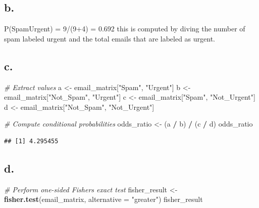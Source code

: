 \documentclass[
]{article}
\newenvironment{Shaded}{\begin{snugshade}}{\end{snugshade}}
\newcommand{\AttributeTok}[1]{\textcolor[rgb]{0.13,0.29,0.53}{#1}}
\newcommand{\CommentTok}[1]{\textcolor[rgb]{0.56,0.35,0.01}{\textit{#1}}}
\newcommand{\FunctionTok}[1]{\textcolor[rgb]{0.13,0.29,0.53}{\textbf{#1}}}
\newcommand{\NormalTok}[1]{#1}
\newcommand{\OtherTok}[1]{\textcolor[rgb]{0.56,0.35,0.01}{#1}}
\newcommand{\SpecialCharTok}[1]{\textcolor[rgb]{0.81,0.36,0.00}{\textbf{#1}}}
\newcommand{\StringTok}[1]{\textcolor[rgb]{0.31,0.60,0.02}{#1}}
\begin{document}
\subsection{b.}\label{b.}

P(Spam\textbar Urgent) = 9/(9+4) = 0.692 this is computed by diving the
number of spam labeled urgent and the total emails that are labeled as
urgent.

\subsection{c.}\label{c.}

\begin{Shaded}
\begin{Highlighting}[]
\CommentTok{\# Extract values}
\NormalTok{a }\OtherTok{\textless{}{-}}\NormalTok{ email\_matrix[}\StringTok{"Spam"}\NormalTok{, }\StringTok{"Urgent"}\NormalTok{]}
\NormalTok{b }\OtherTok{\textless{}{-}}\NormalTok{ email\_matrix[}\StringTok{"Not\_Spam"}\NormalTok{, }\StringTok{"Urgent"}\NormalTok{]}
\NormalTok{c }\OtherTok{\textless{}{-}}\NormalTok{ email\_matrix[}\StringTok{"Spam"}\NormalTok{, }\StringTok{"Not\_Urgent"}\NormalTok{]}
\NormalTok{d }\OtherTok{\textless{}{-}}\NormalTok{ email\_matrix[}\StringTok{"Not\_Spam"}\NormalTok{, }\StringTok{"Not\_Urgent"}\NormalTok{]}

\CommentTok{\# Compute conditional probabilities}
\NormalTok{odds\_ratio }\OtherTok{\textless{}{-}}\NormalTok{ (a }\SpecialCharTok{/}\NormalTok{ b) }\SpecialCharTok{/}\NormalTok{ (c }\SpecialCharTok{/}\NormalTok{ d)}
\NormalTok{odds\_ratio}
\end{Highlighting}
\end{Shaded}

\begin{verbatim}
## [1] 4.295455
\end{verbatim}

\subsection{d.}\label{d.}

\begin{Shaded}
\begin{Highlighting}[]
\CommentTok{\# Perform one{-}sided Fisher\textquotesingle{}s exact test}
\NormalTok{fisher\_result }\OtherTok{\textless{}{-}} \FunctionTok{fisher.test}\NormalTok{(email\_matrix, }\AttributeTok{alternative =} \StringTok{"greater"}\NormalTok{)}
\NormalTok{fisher\_result}
\end{Highlighting}
\end{Shaded}
\end{document}
